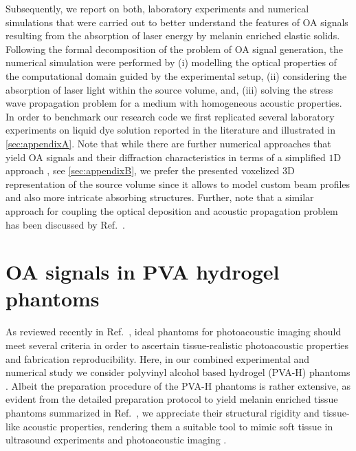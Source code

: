 \documentclass[12pt]{iopart}
\begin{document}
Subsequently, we report on both, laboratory experiments and numerical
simulations that were carried out to better understand the features of OA
signals resulting from the absorption of laser energy by melanin enriched
elastic solids. 
Following the formal decomposition of the problem of OA signal generation, the
numerical simulation were performed by (i) modelling the optical properties of
the computational domain guided by the experimental setup, (ii) considering the
absorption of laser light within the source volume, and, (iii) solving the
stress wave propagation problem for a medium with homogeneous acoustic
properties.  In order to benchmark our research code we first replicated
several laboratory experiments on liquid dye solution reported in the
literature and illustrated in \ref{sec:appendixA}.
Note that while there are further numerical approaches that yield OA signals
and their diffraction characteristics in terms of a simplified $1$D approach
\cite{Terzic:1984,Karabutov:1996}, see \ref{sec:appendixB}, we prefer the
presented voxelized $3$D representation of the source volume since it allows to
model custom beam profiles and also more intricate absorbing structures.
Further, note that a similar approach for coupling the optical deposition and
acoustic propagation problem has been discussed by Ref.\ \cite{Jacques:2014}.

\section{OA signals in PVA hydrogel phantoms}
\label{sec:results}

As reviewed recently in Ref.\ \cite{Fonseca:2016}, ideal phantoms for
photoacoustic imaging should meet several criteria in order to ascertain
tissue-realistic photoacoustic properties and fabrication reproducibility.
Here, in our combined experimental and numerical study we consider polyvinyl
alcohol based hydrogel (PVA-H) phantoms \cite{Kharine:2003,Wollweber:2014}.
Albeit the preparation procedure of the PVA-H phantoms is rather extensive, as
evident from the detailed preparation protocol to yield melanin enriched tissue
phantoms summarized in Ref.\ \cite{Blumenroether:2016}, we appreciate their
structural rigidity and tissue-like acoustic properties, rendering them a
suitable tool to mimic soft tissue in ultrasound experiments \cite{Zell:2007}
and photoacoustic imaging \cite{Xia:2011}. 
\end{document}
